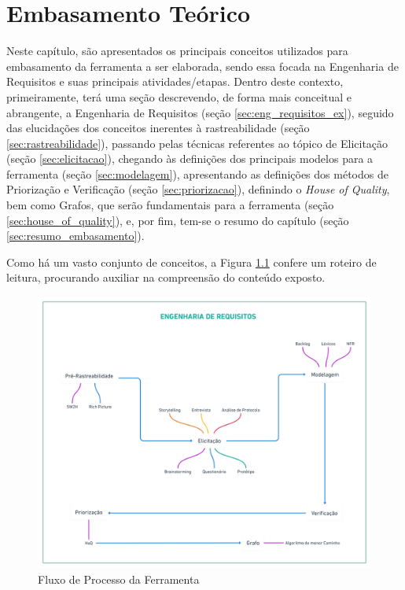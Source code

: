 \chapter[Embasamento Teórico]{Embasamento Teórico}

\label{chap:embasamento_teorico}

Neste capítulo, são apresentados os principais conceitos utilizados para embasamento da ferramenta a ser elaborada, sendo essa focada na Engenharia de Requisitos e suas principais atividades/etapas. Dentro deste contexto, primeiramente, terá uma seção descrevendo, de forma mais conceitual e abrangente, a Engenharia de Requisitos (seção \ref{sec:eng_requisitos_ex}), seguido das elucidações dos conceitos inerentes à rastreabilidade (seção \ref{sec:rastreabilidade}), passando pelas técnicas referentes ao tópico de Elicitação (seção \ref{sec:elicitacao}), chegando às definições dos principais modelos para a ferramenta (seção \ref{sec:modelagem}), apresentando as definições dos métodos de Priorização e Verificação (seção \ref{sec:priorizacao}), definindo o \textit{House of Quality}, bem como Grafos, que serão fundamentais para a ferramenta (seção \ref{sec:house_of_quality}), e, por fim, tem-se o resumo do capítulo (seção \ref{sec:resumo_embasamento}).

Como há um vasto conjunto de conceitos, a Figura \ref{fig:roadmap} confere um roteiro de leitura, procurando auxiliar na compreensão do conteúdo exposto.

\begin{figure}[H]
    \begin{center}
        \caption{Fluxo de Processo da Ferramenta}
        \label{fig:roadmap}
        \includegraphics[scale=0.1]{figuras/Embasamento/roadmap.png}
    \end{center}
\end{figure}

